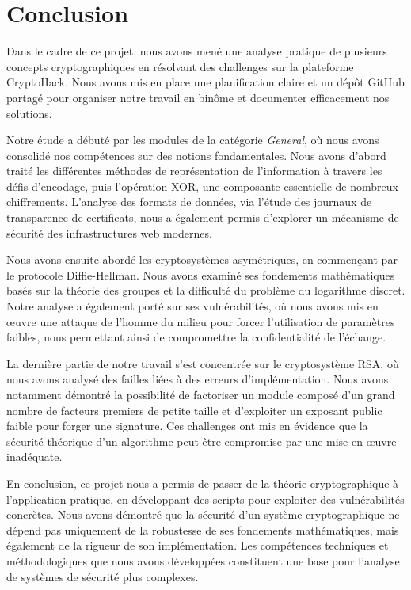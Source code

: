 \section{Conclusion}

Dans le cadre de ce projet, nous avons mené une analyse pratique de plusieurs concepts cryptographiques en résolvant des challenges sur la plateforme CryptoHack. Nous avons mis en place une planification claire et un dépôt GitHub partagé pour organiser notre travail en binôme et documenter efficacement nos solutions.

Notre étude a débuté par les modules de la catégorie \textit{General}, où nous
avons consolidé nos compétences sur des notions fondamentales. Nous avons
d'abord traité les différentes méthodes de représentation de l'information
à travers les défis d'encodage, puis l'opération XOR, une composante
essentielle de nombreux chiffrements. L'analyse des formats de données, via
l'étude des journaux de transparence de certificats, nous a également permis
d'explorer un mécanisme de sécurité des infrastructures web modernes.

Nous avons ensuite abordé les cryptosystèmes asymétriques, en commençant par le
protocole Diffie-Hellman. Nous avons examiné ses fondements mathématiques basés
sur la théorie des groupes et la difficulté du problème du logarithme discret.
Notre analyse a également porté sur ses vulnérabilités, où nous avons mis en
œuvre une attaque de l'homme du milieu pour forcer l'utilisation de paramètres
faibles, nous permettant ainsi de compromettre la confidentialité de l'échange.

La dernière partie de notre travail s'est concentrée sur le cryptosystème RSA,
où nous avons analysé des failles liées à des erreurs d'implémentation. Nous
avons notamment démontré la possibilité de factoriser un module composé d'un
grand nombre de facteurs premiers de petite taille et d'exploiter un exposant
public faible pour forger une signature. Ces challenges ont mis en évidence
que la sécurité théorique d'un algorithme peut être compromise par une mise
en œuvre inadéquate.

En conclusion, ce projet nous a permis de passer de la théorie cryptographique
à l'application pratique, en développant des scripts pour exploiter des
vulnérabilités concrètes. Nous avons démontré que la sécurité d'un système
cryptographique ne dépend pas uniquement de la robustesse de ses fondements
mathématiques, mais également de la rigueur de son implémentation. Les
compétences techniques et méthodologiques que nous avons développées
constituent une base pour l'analyse de systèmes de sécurité plus complexes.